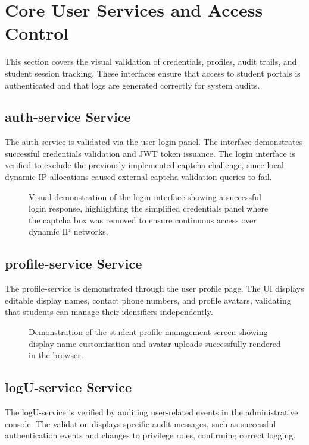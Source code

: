 \documentclass[12pt]{article}
\begin{document}
\section{Core User Services and Access Control}
This section covers the visual validation of credentials, profiles, audit trails, and student session tracking. These interfaces ensure that access to student portals is authenticated and that logs are generated correctly for system audits.

\subsection{auth-service Service}
The auth-service is validated via the user login panel. The interface demonstrates successful credentials validation and JWT token issuance. The login interface is verified to exclude the previously implemented captcha challenge, since local dynamic IP allocations caused external captcha validation queries to fail.

\begin{figure}[htbp]
    \centering
    \caption{Visual demonstration of the login interface showing a successful login response, highlighting the simplified credentials panel where the captcha box was removed to ensure continuous access over dynamic IP networks.}
    \label{fig:login_panel}
\end{figure}

\subsection{profile-service Service}
The profile-service is demonstrated through the user profile page. The UI displays editable display names, contact phone numbers, and profile avatars, validating that students can manage their identifiers independently.

\begin{figure}[htbp]
    \centering
    \caption{Demonstration of the student profile management screen showing display name customization and avatar uploads successfully rendered in the browser.}
    \label{fig:profile_page}
\end{figure}

\subsection{logU-service Service}
The logU-service is verified by auditing user-related events in the administrative console. The validation displays specific audit messages, such as successful authentication events and changes to privilege roles, confirming correct logging.
\end{document}
